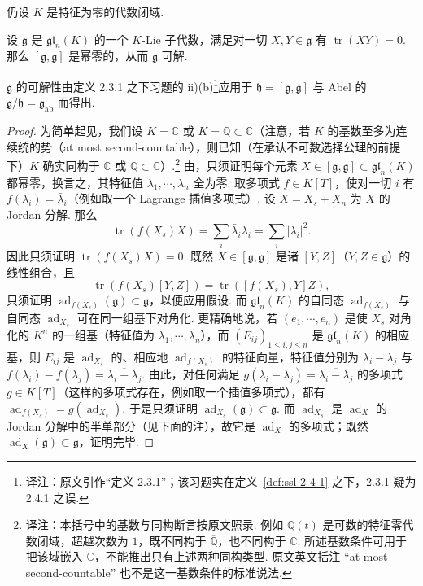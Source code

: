 \begin{numpara}\label{np:ssl-2-4-4}
仍设 $K$ 是特征为零的代数闭域.
\begin{proposition*}
设 $\mathfrak{g}$ 是 $\mathfrak{gl}_n(K)$ 的一个 $K$-Lie 子代数，满足对一切 $X, Y \in \mathfrak{g}$ 有 $\operatorname{tr}(XY) = 0$. 那么 $[\mathfrak{g}, \mathfrak{g}]$ 是幂零的，从而 $\mathfrak{g}$ 可解.
\end{proposition*}
\begin{remark*}
$\mathfrak{g}$ 的可解性由定义 2.3.1 之下习题的 ii)(b)\footnote{译注：原文引作``定义 2.3.1''；该习题实在定义~\ref{def:ssl-2-4-1} 之下，2.3.1 疑为 2.4.1 之误.}应用于 $\mathfrak{h} = [\mathfrak{g}, \mathfrak{g}]$ 与 Abel 的 $\mathfrak{g}/\mathfrak{h} = \mathfrak{g}_{\mathrm{ab}}$ 而得出.
\end{remark*}
\begin{proof}
为简单起见，我们设 $K = \mathbb{C}$ 或 $K = \bar{\mathbb{Q}} \subset \mathbb{C}$（注意，若 $K$ 的基数至多为连续统的势（at most second-countable），则已知（在承认不可数选择公理的前提下）$K$ 确实同构于 $\mathbb{C}$ 或 \mbox{$\bar{\mathbb{Q}} \subset \mathbb{C}$）.}\footnote{译注：本括号中的基数与同构断言按原文照录. 例如 $\overline{\mathbb Q(t)}$ 是可数的特征零代数闭域，超越次数为 $1$，既不同构于 $\overline{\mathbb Q}$，也不同构于 $\mathbb C$. 所述基数条件可用于把该域嵌入 $\mathbb C$，不能推出只有上述两种同构类型. 原文英文括注 ``at most second-countable'' 也不是这一基数条件的标准说法.} 由，只须证明每个元素 $X \in [\mathfrak{g}, \mathfrak{g}] \subset \mathfrak{gl}_n(K)$ 都幂零，换言之，其特征值 $\lambda_1, \cdots, \lambda_n$ 全为零. 取多项式 $f \in K[T]$，使对一切 $i$ 有 $f(\lambda_i) = \bar{\lambda}_i$（例如取一个 Lagrange 插值多项式）. 设 $X = X_s + X_n$ 为 $X$ 的 Jordan 分解. 那么
\[\operatorname{tr}(f(X_s)X) = \sum_i \bar{\lambda}_i \lambda_i = \sum_i |\lambda_i|^2.\]
因此只须证明 $\operatorname{tr}(f(X_s)X) = 0$.
既然 $X \in [\mathfrak{g}, \mathfrak{g}]$ 是诸 $[Y, Z]$（$Y, Z \in \mathfrak{g}$）的线性组合，且
\[\operatorname{tr}(f(X_s)[Y, Z]) = \operatorname{tr}([f(X_s), Y]Z),\]
只须证明 $\operatorname{ad}_{f(X_s)}(\mathfrak{g}) \subset \mathfrak{g}$，以便应用假设. 而 $\mathfrak{gl}_n(K)$ 的自同态 $\operatorname{ad}_{f(X_s)}$ 与自同态 $\operatorname{ad}_{X_s}$ 可在同一组基下对角化. 更精确地说，若 $(e_1, \cdots, e_n)$ 是使 $X_s$ 对角化的 $K^n$ 的一组基（特征值为 $\lambda_1, \cdots, \lambda_n$），而 $(E_{ij})_{1 \leqslant i,j \leqslant n}$ 是 $\mathfrak{gl}_n(K)$ 的相应基，则 $E_{ij}$ 是 $\operatorname{ad}_{X_s}$ 的、相应地 $\operatorname{ad}_{f(X_s)}$ 的特征向量，特征值分别为 $\lambda_i - \lambda_j$ 与 $f(\lambda_i) - f(\lambda_j) = \overline{\lambda_i - \lambda_j}$. 由此，对任何满足 $g(\lambda_i - \lambda_j) = \overline{\lambda_i - \lambda_j}$ 的多项式 $g \in K[T]$（这样的多项式存在，例如取一个插值多项式），都有 $\operatorname{ad}_{f(X_s)} = g(\operatorname{ad}_{X_s})$. 于是只须证明 $\operatorname{ad}_{X_s}(\mathfrak{g}) \subset \mathfrak{g}$. 而 $\operatorname{ad}_{X_s}$ 是 $\operatorname{ad}_X$ 的 Jordan 分解中的半单部分（见下面的注），故它是 $\operatorname{ad}_X$ 的多项式；既然 $\operatorname{ad}_X(\mathfrak{g}) \subset \mathfrak{g}$，证明完毕.

\end{proof}
\end{numpara}
